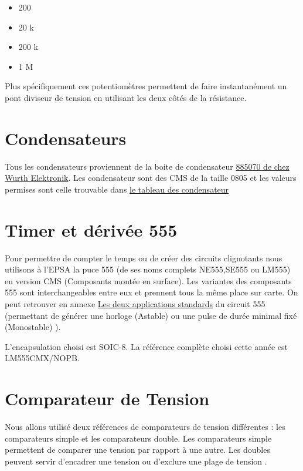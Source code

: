 \documentclass{EPSA-rap-template}
\begin{document}
\begin{itemize}
\item 200 \Omega
\item 20 k \Omega
\item 200 k \Omega
\item 1 M \Omega
\end{itemize}

Plus spécifiquement ces potentiomètres permettent de faire instantanément un pont diviseur de tension en utilisant les deux côtés de la résistance.

\section{Condensateurs}

Tous les condensateurs proviennent de la boite de condensateur \href{https://fr.farnell.com/wurth-elektronik/885070/kit-condensateur-ceram-multicouche/dp/2491608}{885070 de chez Wurth Elektronik}. Les condensateur sont des CMS de la taille 0805 et les valeurs permises sont celle trouvable dans \hyperlink{CapTab}{le tableau des condensateur}

\section{Timer et dérivée 555}

Pour permettre de compter le temps ou de créer des circuits clignotants nous utilisons à l'EPSA la puce 555 (de ses noms complets NE555,SE555 ou LM555) en version CMS (Composants montée en surface). Les variantes des composants 555 sont interchangeables entre eux et prennent tous la même place sur carte. On peut retrouver en annexe \hyperlink{555}{Les deux applications standards} du circuit 555 (permettant de générer une horloge (Astable) ou une pulse de durée minimal fixé (Monostable) ).

L'encapsulation choisi est SOIC-8. La référence complète choisi cette année est LM555CMX/NOPB.



\section{Comparateur de Tension}

Nous allons utilisé deux références de comparateurs de tension différentes : les comparateurs simple et les comparateurs double. Les comparateurs simple permettent de comparer une tension par rapport à une autre. Les doubles peuvent servir d'encadrer une tension ou d'exclure une plage de tension .
\end{document}
